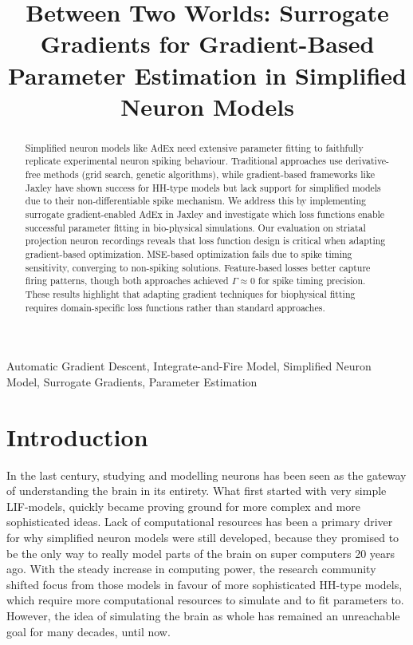 \documentclass[conference]{IEEEtran}
\begin{document}
\title{Between Two Worlds: Surrogate Gradients for Gradient-Based Parameter Estimation in Simplified Neuron Models}

\author{
}

\maketitle

\begin{abstract}
Simplified neuron models like AdEx need extensive parameter fitting to faithfully replicate experimental neuron spiking behaviour.
Traditional approaches use derivative-free methods (grid search, genetic algorithms),
while gradient-based frameworks like Jaxley have shown success for HH-type models but lack support for simplified models due to their non-differentiable spike mechanism.
We address this by implementing surrogate gradient-enabled AdEx in Jaxley and investigate which loss functions enable successful parameter fitting in bio-physical simulations.
Our evaluation on striatal projection neuron recordings reveals that loss function design is critical when adapting gradient-based optimization.
MSE-based optimization fails due to spike timing sensitivity, converging to non-spiking solutions.
Feature-based losses better capture firing patterns, though both approaches achieved $\Gamma \approx 0$ for spike timing precision.
These results highlight that adapting gradient techniques for biophysical fitting requires domain-specific loss functions rather than standard approaches.
\end{abstract}

\begin{IEEEkeywords}
Automatic Gradient Descent, Integrate-and-Fire Model, Simplified Neuron Model, Surrogate Gradients, Parameter Estimation
\end{IEEEkeywords}

\section{Introduction}\label{sec:intro}
In the last century, studying and modelling neurons has been seen as the gateway of understanding the brain in its entirety.
What first started with very simple \ac{LIF}-models, quickly became proving ground for more complex and more sophisticated ideas.
Lack of computational resources has been a primary driver for why simplified neuron models were still developed, because they promised to be the only way to really model parts of the brain on super computers 20 years ago.
With the steady increase in computing power, the research community shifted focus from those models in favour of more sophisticated \ac{HH}-type models, which require more computational resources to simulate and to fit parameters to.
However, the idea of simulating the brain as whole has remained an unreachable goal for many decades, until now.
\end{document}

